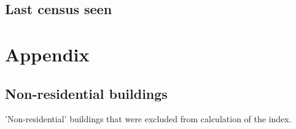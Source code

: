 \documentclass[a4paper, notitlepage, fleqn]{article} %
\begin{document}
\subsection{Last census seen}
\begin{stlog}\end{stlog}
\newpage
\section{Appendix}

\subsection{Non-residential buildings}

'Non-residential' buildings that were excluded from calculation of the index.
\begin{stlog}\end{stlog}
\end{document}
